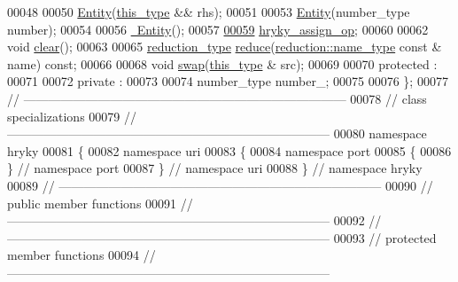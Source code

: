 \begin{DoxyCode}
00048 
00050     \hyperlink{classhryky_1_1uri_1_1port_1_1_entity_ae2e3ee42bba9f775c59dccfcbfcd7aec}{Entity}(\hyperlink{classhryky_1_1uri_1_1port_1_1_entity}{this_type} && rhs);
00051 
00053     \hyperlink{classhryky_1_1uri_1_1port_1_1_entity_ae2e3ee42bba9f775c59dccfcbfcd7aec}{Entity}(number\_type number);
00054 
00056     \hyperlink{classhryky_1_1uri_1_1port_1_1_entity_a847ccc419b8ab88d4fbafd8adb265a8d}{~Entity}();
00057 
\hypertarget{uri__port__entity_8h_source_l00059}{}\hyperlink{classhryky_1_1uri_1_1port_1_1_entity_ac9ee02bd49d6b6fe48dfd3abf9155e53}{00059}     \hyperlink{classhryky_1_1uri_1_1port_1_1_entity_ac9ee02bd49d6b6fe48dfd3abf9155e53}{hryky_assign_op};
00060 
00062     \textcolor{keywordtype}{void} \hyperlink{classhryky_1_1uri_1_1port_1_1_entity_abc2f0935f709c5e1832d5720634071d4}{clear}();
00063 
00065     \hyperlink{classhryky_1_1_intrusive_ptr}{reduction_type} \hyperlink{classhryky_1_1uri_1_1port_1_1_entity_ad393f090d7bb1230ce0855a9f1df18a3}{reduce}(\hyperlink{classhryky_1_1reduction_1_1_string}{reduction::name_type} \textcolor{keyword}{const} & name) \textcolor{keyword}{const};
00066 
00068     \textcolor{keywordtype}{void} \hyperlink{classhryky_1_1uri_1_1port_1_1_entity_ae9c086b2e892d64c2a5ab57bfd24c980}{swap}(\hyperlink{classhryky_1_1uri_1_1port_1_1_entity}{this_type} & src);
00069 
00070 \textcolor{keyword}{protected} :
00071 
00072 \textcolor{keyword}{private} :
00073 
00074     number\_type number\_;
00075 
00076 \};
00077 \textcolor{comment}{//
      ------------------------------------------------------------------------------}
00078 \textcolor{comment}{// class specializations}
00079 \textcolor{comment}{//
      ------------------------------------------------------------------------------}
00080 \textcolor{keyword}{namespace }hryky
00081 \{
00082 \textcolor{keyword}{namespace }uri
00083 \{
00084 \textcolor{keyword}{namespace }port
00085 \{
00086 \} \textcolor{comment}{// namespace port}
00087 \} \textcolor{comment}{// namespace uri}
00088 \} \textcolor{comment}{// namespace hryky}
00089 \textcolor{comment}{//
      ------------------------------------------------------------------------------}
00090 \textcolor{comment}{// public member functions}
00091 \textcolor{comment}{//
      ------------------------------------------------------------------------------}
00092 \textcolor{comment}{//
      ------------------------------------------------------------------------------}
00093 \textcolor{comment}{// protected member functions}
00094 \textcolor{comment}{//
      ------------------------------------------------------------------------------}

\end{DoxyCode}
